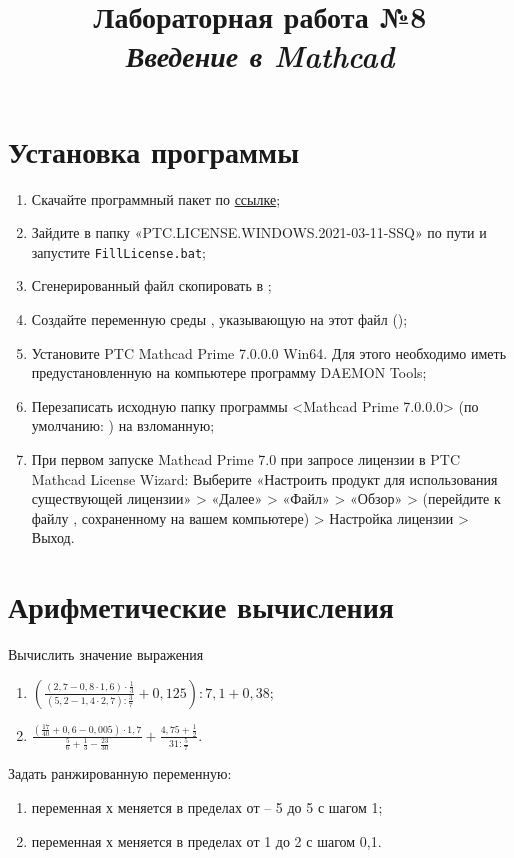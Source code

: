 \documentclass[14pt,a4paper]{article}
\title{Лабораторная работа №8 \\ \textit{Введение в Mathcad}}
\begin{document}
\maketitle

\progress{}
\section{Установка программы}
\begin{enumerate}
	\item Скачайте программный пакет по \href{https://mega.nz/folder/RcEhUTQT#3cT2O6J15wOCQbFn4E7BBw}{ссылке};
	\item Зайдите в папку «PTC.LICENSE.WINDOWS.2021-03-11-SSQ» по пути 
    и запустите \texttt{FillLicense.bat};
	\item Сгенерированный файл  скопировать в ;
	\item Создайте переменную среды , указывающую на этот файл ();
	\item Установите PTC Mathcad Prime 7.0.0.0 Win64. Для этого необходимо иметь предустановленную на компьютере программу DAEMON Tools;
	\item Перезаписать исходную папку программы <Mathcad Prime 7.0.0.0>
    (по умолчанию:  ) на взломанную;
	\item При первом запуске Mathcad Prime 7.0 при запросе лицензии в PTC Mathcad License Wizard: Выберите «Настроить продукт для использования существующей лицензии» > «Далее» > «Файл» > «Обзор» > (перейдите к файлу , сохраненному на вашем компьютере) > Настройка лицензии > Выход.
\end{enumerate}
\section{Арифметические вычисления}
\noindent Вычислить значение выражения
\begin{enumerate}
	\item $\left(\frac{(2,7-0,8 \cdot 1,6) \cdot \frac{1}{3}}{(5,2-1,4 \cdot 2,7): \frac{3}{7}}+0,125\right): 7,1+0,38$;
	\item $\frac{\left(\frac{17}{40}+0,6-0,005\right) \cdot 1,7}{\frac{5}{6}+\frac{1}{3}-\frac{23}{30}}+\frac{4,75+\frac{1}{2}}{31: \frac{5}{7}}$.
\end{enumerate}
Задать ранжированную переменную:
\begin{enumerate}
	\item переменная х меняется в пределах от – 5 до 5 с шагом 1;
	\item переменная х меняется в пределах от 1 до 2 с шагом 0,1.
\end{enumerate}
\end{document}
